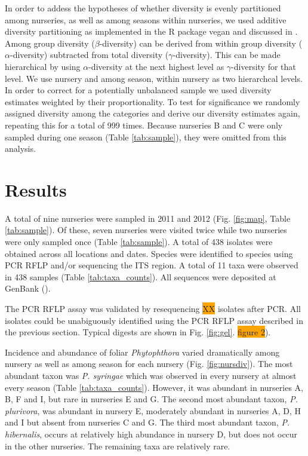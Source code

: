 \documentclass[12pt]{article}
\begin{document}
In order to addess the hypotheses of whether diversity is evenly partitioned among nurseries, as well as among seasons within nurseries, we used additive diversity partitioning as implemented in the R package vegan \cite{vegan} and discussed in \cite{lande_1996, christ_etal_2003}.  Among group diversity ($\beta$-diversity) can be derived from within group diversity ($\alpha$-diversity) subtracted from total diversity ($\gamma$-diversity).  This can be made hierarchical by using $\alpha$-diversity at the next highest level as $\gamma$-diversity for that level.  We use nursery and among season, within nursery as two hierarchcal levels.  In order to correct for a potentially unbalanced sample we used diversity estimates weighted by their proportionality.  To test for significance we randomly assigned diversity among the categories and derive our diversity estimates again, repeating this for a total of 999 times.  Because nurseries B and C were only sampled during one season (Table \ref{tab:sample}), they were omitted from this analysis.

\section*{\sffamily\normalsize{Results}}

A total of nine nurseries were sampled in 2011 and 2012 (Fig. \ref{fig:map}, Table \ref{tab:sample}).  Of these, seven nurseries were visited twice while two nurseries were only sampled once (Table \ref{tab:sample}).  A total of 438 isolates were obtained across all locations and dates.  Species were identified to species using PCR RFLP and/or sequencing the ITS region. A total of 11 taxa were observed in 438 samples (Table \ref{tab:taxa_counts}).  All sequences were deposited at GenBank ().

The PCR RFLP assay was validated by resequencing \colorbox{orange}{XX} isolates after PCR. All isolates could be unabiguously identified using the PCR RFLP assay described in the previous section. Typical digests are shown in Fig. \ref{fig:gel}. \colorbox{orange}{figure 2}).

Incidence and abundance of foliar \emph{Phytophthora} varied dramatically among nursery as well as among season for each nursery (Fig. \ref{fig:nursdiv}).  The most abundant taxon was \emph{P. syringae} which was observed in every nursery at almost every season (Table \ref{tab:taxa_counts}).  However, it was abundant in nurseries A, B, F and I, but rare in nurseries E and G.  The second most abundant taxon, \emph{P. plurivora}, was abundant in nursery E, moderately abundant in nurseries A, D, H and I but absent from nurseries C and G.  The third most abundant taxon, \emph{P. hibernalis}, occurs at relatively high abundance in nursery D, but does not occur in the other nurseries.  The remaining taxa are relatively rare.
\end{document}
